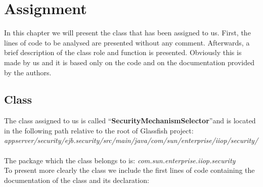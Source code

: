 \documentclass[\mainpath/main]{subfiles}
\begin{document}
\chapter{Assignment} %
\label{Assignment}

\setmyfancystyle

In this chapter we will present the class that has been assigned to us. First, the lines of code to be analysed are presented without any comment. Afterwards, a brief description of the class role and function is presented. Obviously this is made by us and it is based only on the code and on the documentation provided by the authors. 


\section{Class}
\label{Assignment:Class}
The class assigned to us is called \textquotedblleft \textbf{SecurityMechanismSelector}\textquotedblright and is located in the following path relative to the root of Glassfish project:\\
\textit{
appserver/security/ejb.security/src/main/java/com/sun/enterprise/iiop/security/
}\\ \\
The package which the class belongs to is: \textit{com.sun.enterprise.iiop.security}\\
To present more clearly the class we include the first lines of code containing the documentation of the class and its declaration:
\end{document}
